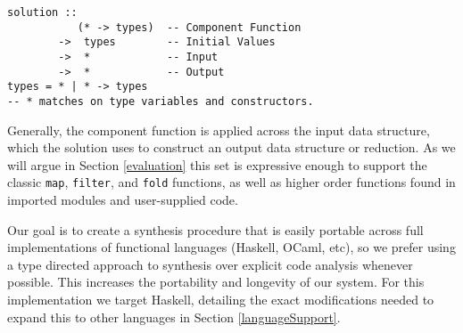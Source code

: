 \begin{lstlisting}
solution ::
           (* -> types)  -- Component Function
        ->  types        -- Initial Values
        ->  *            -- Input
        ->  *            -- Output
types = * | * -> types
-- * matches on type variables and constructors.
\end{lstlisting}

Generally, the component function is applied across the \textsf{input} data structure, which the \textsf{solution} uses to construct an \textsf{output} data structure or reduction. As we will argue in Section \ref{evaluation} this set is expressive enough to support the classic \texttt{map}, \texttt{filter}, and \texttt{fold} functions, as well as higher order functions found in imported modules and user-supplied code.

Our goal is to create a synthesis procedure that is easily portable across full implementations of functional languages (Haskell, OCaml, etc), so we prefer using a type directed approach to synthesis over explicit code analysis whenever possible. This increases the portability and longevity of our system. For this implementation we target Haskell, detailing the exact modifications needed to expand this to other languages in Section \ref{languageSupport}.


